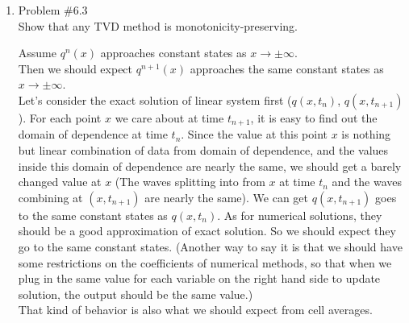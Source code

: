 \documentclass[11pt]{article}
\begin{document}
\begin{enumerate}
\qed
\newpage
    \item Problem \#6.3 \\
            Show that any TVD method is monotonicity-preserving.

        \vskip 5pt
        \vskip 5pt
        
            Assume $q^n(x)$ approaches constant states as $x\rightarrow \pm\infty$.\\
            Then we should expect $q^{n+1}(x)$ approaches the same constant states as $x\rightarrow \pm\infty$.\\
            
            Let's consider the exact solution of linear system first ($q(x,t_n)$, $q(x,t_{n+1})$). For each point $x$ we care about at time $t_{n+1}$, it is easy to find out the domain of dependence at time $t_n$. Since the value at this point $x$ is nothing but linear combination of data from domain of dependence, and the values inside this domain of dependence are nearly the same, we should get a barely changed value at $x$ (The waves splitting into from $x$ at time $t_n$ and the waves combining at $(x,t_{n+1})$ are nearly the same). We can get $q(x,t_{n+1})$ goes to the same constant states as $q(x,t_n)$. As for numerical solutions, they should be a good approximation of exact solution. So we should expect they go to the same constant states. (Another way to say it is that we should have some restrictions on the coefficients of numerical methods, so that when we plug in the same value for each variable on the right hand side to update solution, the output should be the same value.)\\
            
            That kind of behavior is also what we should expect from cell averages.\\
            

\end{enumerate}
\end{document}
